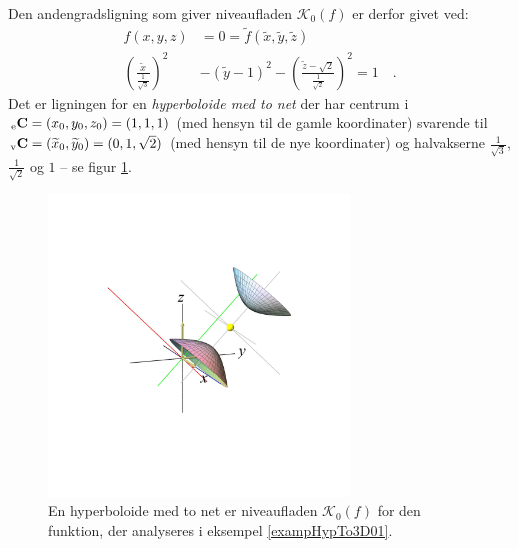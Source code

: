 \begin{example}
\begin{equation}
\begin{aligned}
\end{aligned}
\end{equation}
Den andengradsligning som giver niveaufladen $\mathcal{K}_{0}(f)$ er derfor givet ved:
\begin{equation}
\begin{aligned}
f(x,y,z) &= 0 =
\widetilde{f}(\widetilde{x}, \widetilde{y}, \widetilde{z}) \\
\left(\frac{\widetilde{x}}{\frac{1}{\sqrt{3}}}\right)^{2} &-  \left(\widetilde{y} -1\right)^{2} - \left(\frac{\widetilde{z} - \sqrt{2}}{\frac{1}{\sqrt{2}}}\right)^{2} = 1 \quad .
\end{aligned}
\end{equation}
Det er ligningen for en \emph{hyperboloide med to  net} der har  centrum i ${_\mathrm{e}\mathbf{\mathbf{C}}} = (x_{0}, y_{0}, z_{0}) =  (1,1,1)$ (med hensyn til de gamle koordinater) svarende til
${_\mathrm{v}\mathbf{\mathbf{C}}} = (\widetilde{x}_{0}, \widetilde{y}_{0}) =  (0, 1, \sqrt{2})$ (med hensyn til de nye koordinater)  og halvakserne $\frac{1}{\sqrt{3}}$, $\frac{1}{\sqrt{2}}$ og $1$ --  se figur \ref{figHypTo3D01Kvad}.
\end{example}



\begin{figure}[ht]
\centerline{  \includegraphics[height=80mm]{FIGS/plotHypTo3D01Kvad.pdf}}
\begin{center}
\caption{En hyperboloide med to net er niveaufladen $\mathcal{K}_{0}(f)$ for den funktion, der analyseres i eksempel \ref{exampHypTo3D01}.} \label{figHypTo3D01Kvad}
\end{center}
\end{figure}















